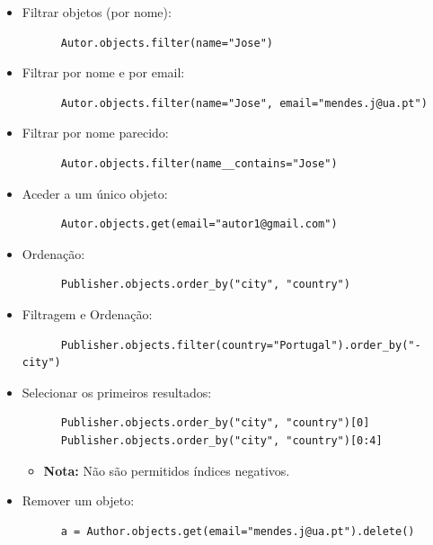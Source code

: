 \documentclass{article}
\begin{document}
\begin{flushleft}
\begin{itemize}
    \pagebreak

    \item Filtrar objetos (por nome):
    \begin{lstlisting}
      Autor.objects.filter(name="Jose")
    \end{lstlisting}

    \item Filtrar por nome e por email:
    \begin{lstlisting}
      Autor.objects.filter(name="Jose", email="mendes.j@ua.pt")
    \end{lstlisting}

    \item Filtrar por nome parecido:
    \begin{lstlisting}
      Autor.objects.filter(name__contains="Jose")  
    \end{lstlisting}

    \item Aceder a um único objeto:
    \begin{lstlisting}
      Autor.objects.get(email="autor1@gmail.com")   
    \end{lstlisting}

    \item Ordenação:
    \begin{lstlisting}
      Publisher.objects.order_by("city", "country")
    \end{lstlisting}

    \item Filtragem e Ordenação:
    \begin{lstlisting}
      Publisher.objects.filter(country="Portugal").order_by("-city")
    \end{lstlisting}

    \item Selecionar os primeiros resultados:
    \begin{lstlisting}
      Publisher.objects.order_by("city", "country")[0]
      Publisher.objects.order_by("city", "country")[0:4]
    \end{lstlisting}
    \begin{itemize}
      \item \textbf{Nota:} Não são permitidos índices negativos.
    \end{itemize}

    \item Remover um objeto:
    \begin{lstlisting}
      a = Author.objects.get(email="mendes.j@ua.pt").delete()
    \end{lstlisting}
  \end{itemize}
\end{flushleft}
\end{document}
